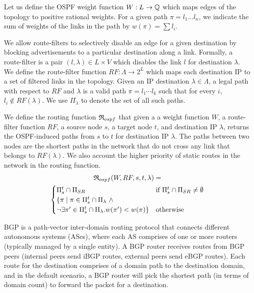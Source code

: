 Let us
define the OSPF weight function $W: L \rightarrow \mathbb{Q}$ which 
maps edges of the topology to positive rational weights. 
For a given
path $\pi=l_1\ldots l_n$, we indicate the sum of weights of the
links in the path by $w(\pi)=\sum l_i$. 


We allow route-filters
to selectively disable an
edge for a given destination by  
blocking advertisements to a
particular destination along a link. 
Formally, a route-filter is a pair $(l,\lambda)\in L\times V$
which disables the link $l$ for destination $\lambda$. 
We define the route-filter function 
$RF: \Lambda \rightarrow 2^L$ which maps each destination IP
to a set of filtered links in the topology. 
Given an IP destination $\lambda\in \Lambda$, 
a legal path with respect to $RF$ and $\lambda$
is a valid path $\pi=l_1\cdots l_k$ such that for every $i$,
$l_i\not\in RF(\lambda)$.
We use $\Pi_\lambda$ to denote the set of all such paths.

We define the routing function 
$\mathfrak{R}_{ospf}$ 
that given a 
a weight function $W$,
a route-filter function $RF$,
a source node $s$,
a target node $t$,
and destination IP 
$\lambda$,
returns the OSPF-induced paths from $s$ to $t$ for destination IP $\lambda$.
The paths between two nodes are
the shortest paths in the network
that do not cross any link that belongs to $RF(\lambda)$. We also
account the higher priority of static routes 
in the network in the routing function.
\begin{multline}
\mathfrak{R}_{ospf}(W,RF,s,t,\lambda) = \\
\begin{cases}
\text{$\Pi_s^t \cap \Pi_{SR}$}  & \text{if $\Pi_s^t \cap \Pi_{SR} \not=\emptyset$} \\
\text{$\{\pi \mid  \pi\in \Pi_s^t\cap \Pi_\lambda ~\wedge $} & \\
\text{$\neg\exists \pi'\in\Pi_s^t\cap \Pi_\lambda . w(\pi')< w(\pi)\}$} & \text{otherwise}
\end{cases}
\end{multline}

BGP is a path-vector inter-domain 
routing protocol that connects 
different autonomous systems (ASes), where each AS
comprises of one or more routers (typically managed
by a single entity). A BGP router receives routes 
from BGP peers (internal peers send iBGP routes, 
external peers send eBGP routes). Each route 
for the destination comprises of a domain path
 to the destination domain, and in the default
 scenario, a BGP router will pick the shortest
 path (in terms of domain count) to forward
 the packet for a destination. 
 

